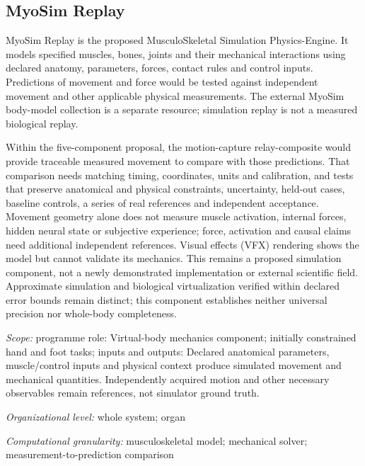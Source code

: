 \subsection*{MyoSim Replay}
\noindent MyoSim Replay is the proposed MusculoSkeletal Simulation Physics-Engine. It models specified muscles, bones, joints and their mechanical interactions using declared anatomy, parameters, forces, contact rules and control inputs. Predictions of movement and force would be tested against independent movement and other applicable physical measurements. The external MyoSim body-model collection is a separate resource; simulation replay is not a measured biological replay.\par
\noindent Within the five-component proposal, the motion-capture relay-composite would provide traceable measured movement to compare with those predictions. That comparison needs matching timing, coordinates, units and calibration, and tests that preserve anatomical and physical constraints, uncertainty, held-out cases, baseline controls, a series of real references and independent acceptance. Movement geometry alone does not measure muscle activation, internal forces, hidden neural state or subjective experience; force, activation and causal claims need additional independent references. Visual effects (VFX) rendering shows the model but cannot validate its mechanics. This remains a proposed simulation component, not a newly demonstrated implementation or external scientific field. Approximate simulation and biological virtualization verified within declared error bounds remain distinct; this component establishes neither universal precision nor whole-body completeness.\par
\noindent\textit{Scope:} programme role: Virtual-body mechanics component; initially constrained hand and foot tasks; inputs and outputs: Declared anatomical parameters, muscle/control inputs and physical context produce simulated movement and mechanical quantities. Independently acquired motion and other necessary observables remain references, not simulator ground truth.\par
\noindent\textit{Organizational level:} whole system; organ\par
\begin{samepage}
\noindent\textit{Computational granularity:} musculoskeletal model; mechanical solver; measurement-to-prediction comparison\par\nopagebreak[4]

\end{samepage}


